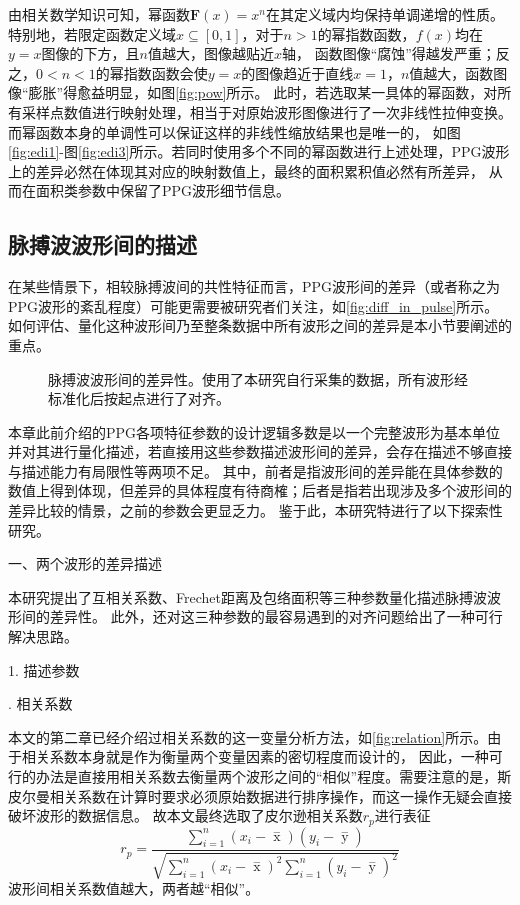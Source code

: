 由相关数学知识可知，幂函数$\boldsymbol F(x)=x^n$在其定义域内均保持单调递增的性质。特别地，若限定函数定义域$x\subseteq [0,1]$，对于$n>1$的幂指数函数，$f(x)$均在$y=x$图像的下方，且$n$值越大，图像越贴近$x$轴，
函数图像“腐蚀”得越发严重；反之，$0<n<1$的幂指数函数会使$y=x$的图像趋近于直线$x=1$，$n$值越大，函数图像“膨胀”得愈益明显，如图\autoref{fig:pow}所示。
此时，若选取某一具体的幂函数，对所有采样点数值进行映射处理，相当于对原始波形图像进行了一次非线性拉伸变换。而幂函数本身的单调性可以保证这样的非线性缩放结果也是唯一的，
如图\autoref{fig:edi1}-图\autoref{fig:edi3}所示。若同时使用多个不同的幂函数进行上述处理，PPG波形上的差异必然在体现其对应的映射数值上，最终的面积累积值必然有所差异，
从而在面积类参数中保留了PPG波形细节信息。

\subsection{脉搏波波形间的描述}
在某些情景下，相较脉搏波间的共性特征而言，PPG波形间的差异（或者称之为PPG波形的紊乱程度）可能更需要被研究者们关注，如\autoref{fig:diff_in_pulse}所示。
如何评估、量化这种波形间乃至整条数据中所有波形之间的差异是本小节要阐述的重点。
\begin{figure}[htbp]
    \centering
    \quad
    \caption[脉搏波波形间的差异性]{\label{fig:diff_in_pulse}脉搏波波形间的差异性。使用了本研究自行采集的数据，所有波形经标准化后按起点进行了对齐。}
\end{figure}

本章此前介绍的PPG各项特征参数的设计逻辑多数是以一个完整波形为基本单位并对其进行量化描述，若直接用这些参数描述波形间的差异，会存在描述不够直接与描述能力有局限性等两项不足。
其中，前者是指波形间的差异能在具体参数的数值上得到体现，但差异的具体程度有待商榷；后者是指若出现涉及多个波形间的差异比较的情景，之前的参数会更显乏力。
鉴于此，本研究特进行了以下探索性研究。

一、两个波形的差异描述

本研究提出了互相关系数、Frechet距离及包络面积等三种参数量化描述脉搏波波形间的差异性。
此外，还对这三种参数的最容易遇到的对齐问题给出了一种可行解决思路。

1. 描述参数

. 相关系数

本文的第二章已经介绍过相关系数的这一变量分析方法，如\autoref{fig:relation}所示。由于相关系数本身就是作为衡量两个变量因素的密切程度而设计的，
因此，一种可行的办法是直接用相关系数去衡量两个波形之间的“相似”程度。需要注意的是，斯皮尔曼相关系数在计算时要求必须原始数据进行排序操作，而这一操作无疑会直接破坏波形的数据信息。
故本文最终选取了皮尔逊相关系数$r_p$进行表征
\begin{equation}
    \label{equ:pearson2}
    r_p=\frac{\sum_{i=1}^n{(x_i- \mathop{x} \limits^-)(y_i- \mathop{y} \limits^-)}}{\sqrt{{\sum_{i=1}^n}{{(x_i- \mathop{x} \limits^-)^2\sum_{i=1}^n}{(y_i- \mathop{y} \limits^-)^2}}}}
\end{equation}
波形间相关系数值越大，两者越“相似”。

